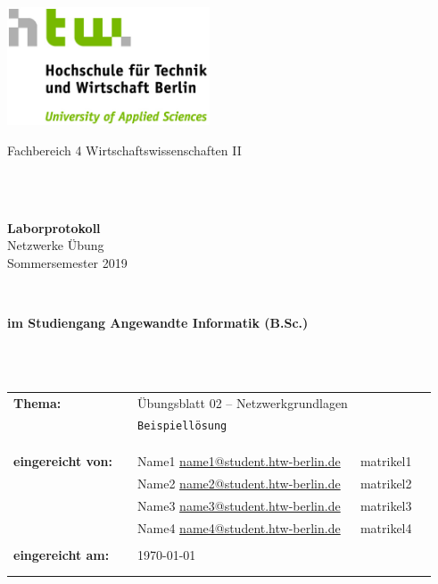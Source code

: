 \documentclass[paper=a4,fontsize=11pt]{scrartcl}%
\numberwithin{equation}{section}
\begin{document}


\begin{titlepage}
\thispagestyle{empty}
\begin{center}
\includegraphics[width=0.45\textwidth]{HTW_Logo_rgb}\\
\end{center}
 
 
\begin{center}
\Large{Fachbereich 4 Wirtschaftswissenschaften II}
\end{center}
\begin{verbatim}
 
 
\end{verbatim}
\begin{center}
\textbf{\LARGE{Laborprotokoll}}\\
Netzwerke Übung\\
Sommersemester 2019
\end{center}
\begin{verbatim}
 

\end{verbatim}
\begin{center}
\textbf{im Studiengang Angewandte Informatik (B.Sc.)}
\end{center}
\begin{verbatim}
 
 
\end{verbatim}
 
\begin{flushleft}
\begin{tabular}{lllll}
\textbf{Thema:} & & Übungsblatt 02 -- Netzwerkgrundlagen \\
& & \texttt{Beispiellösung}\\
& & \\
& & \\
& & \\
\textbf{eingereicht von:}
& & Name1 \href{mailto: name1@htw-berlin.de}{name1@student.htw-berlin.de} & matrikel1\\
& & Name2 \href{mailto: name2@htw-berlin.de}{name2@student.htw-berlin.de} & matrikel2\\
& & Name3 \href{mailto: name3@htw-berlin.de}{name3@student.htw-berlin.de} & matrikel3\\
& & Name4 \href{mailto: name4@htw-berlin.de}{name4@student.htw-berlin.de} & matrikel4\\
\\
\textbf{eingereicht am:} & & \today\\
& & \\
& & \\
\end{tabular}
\end{flushleft}
\end{titlepage}
\end{document}
